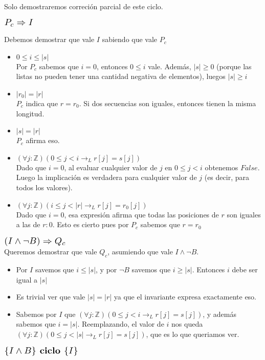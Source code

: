 \documentclass{article}
\begin{document}
\begin{enumerate}[label=\alph*)]
	Solo demostraremos correción parcial de este ciclo.
	\begin{flushleft}$\scalebox{1.3}{$P_c\Rightarrow I$}$\end{flushleft}
	Debemos demostrar que vale $I$ sabiendo que vale $P_c$ 
	\begin{itemize}
		\item $ 0\leq i\leq |s|$\smallskip \\
		Por $P_c$ sabemos que $i=0$, entonces $0\leq i $ vale. Además, $|s|\geq 0$ (porque las listas no pueden tener una cantidad 
		negativa de elementos), luegos $|s|\geq i$
		\item $|r_0|=|r|$\smallskip \\
		$P_c$ indica que $r=r_0$. Si dos secuencias son iguales, entonces tienen la misma longitud.
		\item $|s|=|r|$\smallskip \\
		$P_c$ afirma eso.
		\item $(\forall j:\mathbb{Z})(0\leq j<i \rightarrow_L r[j]=s[j])$\\
		Dado que $i=0$, al evaluar cualquier valor de $j$ en $0\leq j<i$ obtenemos $False$. Luego la implicación es verdadera para
		 cualquier valor de $j$ (es decir, para todos los valores).
		\item $(\forall j:\mathbb{Z})(i\leq j<|r|\rightarrow_L r[j]=r_0[j])$\\
		Dado que $i=0$, esa expresión afirma que todas las posiciones de $r$ son iguales a las de $r:0$. Esto es cierto pues por
		 $P_c$ sabemos que $r=r_0$
	\end{itemize}	 
	$\scalebox{1.3}{$(I\wedge \neg B)\Rightarrow Q_c$}$\smallskip \\
	Queremos demostrar que vale $Q_c$, asumiendo que vale  $I\wedge \neg B$.
	\begin{itemize}
	\item Por $I$ savemos que $i\leq |s|$, y por $\neg B$ savemos que $i\geq |s|$. Entonces $i$ debe ser igual a $|s|$
	\item Es trivial ver que vale $|s|=|r|$ ya que el invariante expresa exactamente eso.
	\item Sabemos por $I$ que $(\forall j:\mathbb{Z})(0\leq j<i \rightarrow_L r[j]=s[j])$, y además sabemos que $i=|s|$. Reemplazando, el 
	valor de $i$ nos queda $(\forall j:\mathbb{Z})(0\leq j<|s| \rightarrow_L r[j]=s[j])$, que es lo que queriamos ver.
	\end{itemize}
	$\scalebox{1.3}{$\{I\wedge B\} \textbf{ ciclo } \{I\}$}$\medskip \\

\end{enumerate}
\end{document}
